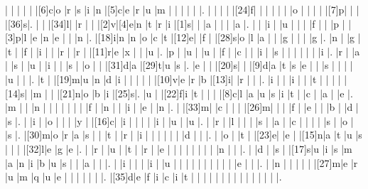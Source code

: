 \documentclass[12pt]{article}
\begin{document}
\begin{Puzzle}{22}{24}
  |{}  |{}  |{}  |{}  |{}  |[6]c|o   |r   |s   |i   |n   |[5]c|e   |r   |u   |m   |{}  |{}  |{}  |{}  |{}  |.
  |{}  |{}  |{}  |{}  |[24]f|{}  |{}  |{}  |{}  |{}  |{}  |o   |{}  |{}  |{}  |{}  |[7]p|{}  |{}  |{}  |[36]s|.
  |{}  |{}  |[34]l|{}  |r   |{}  |{}  |[2]v|[4]e|n   |t   |r   |i   |[1]s|{}  |{}  |a   |{}  |{}  |{}  |a   |.
  |{}  |{}  |i   |{}  |u   |{}  |{}  |{}  |f   |{}  |{}  |p   |{}  |[3]p|l   |e   |n   |e   |{}  |{}  |n   |.
  |[18]i|n   |n   |o   |c   |t   |[12]e|{}  |f   |{}  |[28]s|o   |l   |a   |{}  |{}  |g   |{}  |{}  |{}  |g   |.
  |n   |{}  |g   |{}  |t   |{}  |f   |{}  |i   |{}  |{}  |r   |{}  |r   |{}  |[11]r|e   |x   |{}  |{}  |u   |.
  |p   |{}  |u   |{}  |u   |{}  |f   |{}  |c   |{}  |{}  |i   |{}  |s   |{}  |{}  |{}  |{}  |{}  |{}  |i   |.
  |r   |{}  |a   |{}  |s   |{}  |u   |{}  |i   |{}  |{}  |s   |{}  |o   |{}  |{}  |[31]d|a   |[29]t|u   |s   |.
  |e   |{}  |{}  |[20]s|{}  |{}  |[9]d|a   |t   |s   |e   |{}  |{}  |s   |{}  |{}  |{}  |{}  |u   |{}  |{}  |.
  |t   |{}  |[19]m|u   |n   |d   |i   |{}  |{}  |{}  |{}  |{}  |[10]v|e   |r   |b   |[13]i|{}  |r   |{}  |{}  |.
  |i   |{}  |{}  |i   |{}  |{}  |t   |{}  |{}  |{}  |{}  |[14]s|{}  |m   |{}  |{}  |[21]n|o   |b   |i   |[25]s|.
  |u   |{}  |[22]f|i   |t   |{}  |{}  |{}  |[8]c|l   |a   |u   |s   |i   |t   |{}  |c   |{}  |a   |{}  |e   |.
  |m   |{}  |{}  |n   |{}  |{}  |{}  |{}  |{}  |{}  |{}  |f   |{}  |n   |{}  |{}  |i   |{}  |e   |{}  |n   |.
  |{}  |[33]m|{}  |c   |{}  |{}  |{}  |[26]m|{}  |{}  |{}  |f   |{}  |e   |{}  |{}  |b   |{}  |d   |{}  |s   |.
  |{}  |i   |{}  |o   |{}  |{}  |{}  |y   |{}  |[16]c|{}  |i   |{}  |{}  |{}  |{}  |i   |{}  |u   |{}  |u   |.
  |{}  |r   |{}  |l   |{}  |{}  |{}  |s   |{}  |a   |{}  |c   |{}  |{}  |{}  |{}  |s   |{}  |o   |{}  |s   |.
  |[30]m|o   |r   |a   |s   |{}  |{}  |t   |{}  |r   |{}  |i   |{}  |{}  |{}  |{}  |{}  |{}  |d   |{}  |{}  |.
  |{}  |o   |{}  |t   |{}  |[23]e|{}  |e   |{}  |[15]n|a   |t   |u   |s   |{}  |{}  |{}  |[32]l|e   |g   |e   |.
  |{}  |r   |{}  |u   |{}  |t   |{}  |r   |{}  |e   |{}  |{}  |{}  |{}  |{}  |{}  |{}  |{}  |n   |{}  |{}  |.
  |{}  |d   |{}  |s   |{}  |[17]s|u   |i   |s   |m   |a   |n   |i   |b   |u   |s   |{}  |{}  |a   |{}  |{}  |.
  |{}  |i   |{}  |{}  |{}  |i   |{}  |u   |{}  |{}  |{}  |{}  |{}  |{}  |{}  |{}  |{}  |{}  |e   |{}  |{}  |.
  |{}  |n   |{}  |{}  |{}  |{}  |{}  |[27]m|e   |r   |u   |m   |q   |u   |e   |{}  |{}  |{}  |{}  |{}  |{}  |.
  |[35]d|e   |f   |i   |c   |i   |t   |{}  |{}  |{}  |{}  |{}  |{}  |{}  |{}  |{}  |{}  |{}  |{}  |{}  |{}  |.
\end{Puzzle}
\end{document}
